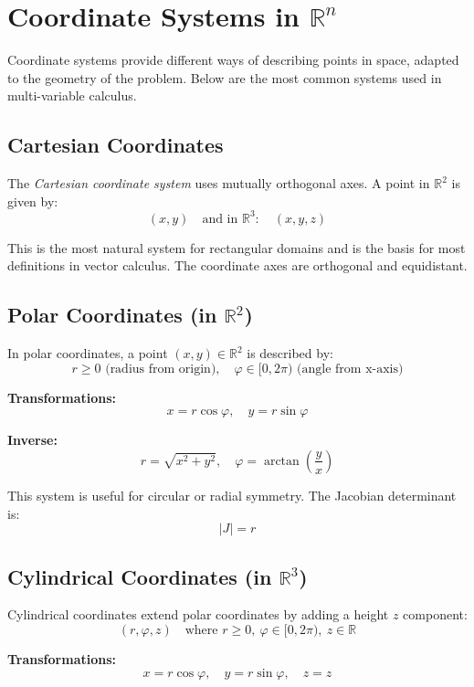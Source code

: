 \section{Coordinate Systems in \( \mathbb{R}^n \)}

Coordinate systems provide different ways of describing points in space, adapted to the geometry of the problem. Below are the most 
common systems used in multi-variable calculus.

\subsection{Cartesian Coordinates}

The \emph{Cartesian coordinate system} uses mutually orthogonal axes. A point in \( \mathbb{R}^2 \) is given by:
\[
(x, y)
\quad \text{and in } \mathbb{R}^3: \quad (x, y, z)
\]

This is the most natural system for rectangular domains and is the basis for most definitions in vector calculus. The coordinate axes are orthogonal and equidistant.


\subsection{Polar Coordinates (in \( \mathbb{R}^2 \))}

In polar coordinates, a point \( (x, y) \in \mathbb{R}^2 \) is described by:
\[
r \ge 0 \text{ (radius from origin)}, \quad \varphi \in [0, 2\pi) \text{ (angle from x-axis)}
\]

\textbf{Transformations:}
\[
x = r \cos \varphi, \quad y = r \sin \varphi
\]

\textbf{Inverse:}
\[
r = \sqrt{x^2 + y^2}, \quad \varphi = \arctan\left(\frac{y}{x}\right)
\]

This system is useful for circular or radial symmetry. The Jacobian determinant is:
\[
|J| = r
\]



\subsection{Cylindrical Coordinates (in \( \mathbb{R}^3 \))}

Cylindrical coordinates extend polar coordinates by adding a height \( z \) component:
\[
(r, \varphi, z) \quad \text{where } r \ge 0, \ \varphi \in [0, 2\pi), \ z \in \mathbb{R}
\]

\textbf{Transformations:}
\[
x = r \cos \varphi, \quad y = r \sin \varphi, \quad z = z
\]

